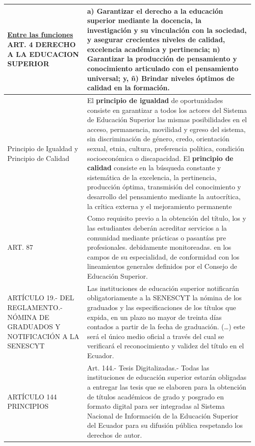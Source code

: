 \documentclass[12pt, a4paper, nofontenc, numbers=endperiod]{apa7}
\begin{document}
{\begin{table}[h]
{{\begin{tabular}{|p{4cm}|p{11.1cm}|}
				\hline
				\vspace*{-0.5mm}\centering\footnotesize \underline{Entre las funciones}\newline
				ART. 4 DERECHO A LA EDUCACION SUPERIOR
				&   \footnotesize a) Garantizar el derecho a la educación superior mediante la docencia, la investigación y su vinculación con la sociedad, y asegurar crecientes niveles de calidad, excelencia académica y pertinencia; n) Garantizar la producción de pensamiento y conocimiento articulado con el pensamiento universal; y, ñ) Brindar niveles óptimos de calidad en la formación.\\
				\hline
				\vspace*{12mm}\centering\footnotesize Principio de Igualdad y Principio de Calidad &  \footnotesize El \textbf{principio de igualdad} de oportunidades consiste en garantizar a todos los actores del Sistema de Educación Superior las mismas posibilidades en el acceso, permanencia, movilidad y egreso del sistema, sin discriminación de género, credo, orientación sexual, etnia, cultura, preferencia política, condición socioeconómica o discapacidad.\newline
				El \textbf{principio de calidad} consiste en la búsqueda constante y sistemática de la excelencia, la pertinencia, producción óptima, transmisión del conocimiento y desarrollo del pensamiento mediante la autocrítica, la crítica externa y el mejoramiento permanente
				\\
				\hline
				\vspace*{4mm}\centering\footnotesize ART. 87 &   \footnotesize Como requisito previo a la obtención del título, los y las estudiantes deberán acreditar servicios a la comunidad mediante prácticas o pasantías pre profesionales. debidamente monitoreadas. en los campos de su especialidad, de conformidad con los lineamientos generales definidos por el Consejo de Educación Superior. \\
				\hline
				\footnotesize ARTÍCULO 19.- DEL REGLAMENTO.- NÓMINA DE GRADUADOS Y NOTIFICACIÓN A LA SENESCYT &   \footnotesize Las instituciones de educación superior notificarán obligatoriamente a la SENESCYT la nómina de los graduados y las especificaciones de los títulos que expida, en un plazo no mayor de treinta días contados a partir de la fecha de graduación. (…) este será el único medio oficial a través del cual se verificará el reconocimiento y validez del título en el Ecuador.  \\
				\hline
				\vspace*{5mm}\centering\footnotesize ARTÍCULO 144 PRINCIPIOS
				&   \footnotesize Art. 144.- Tesis Digitalizadas.- Todas las instituciones de educación superior estarán obligadas a entregar las tesis que se elaboren para la obtención de títulos académicos de grado y posgrado en formato digital para ser integradas al Sistema Nacional de Información de la Educación Superior del Ecuador para su difusión pública respetando los derechos de autor.    \\
				\hline
			\end{tabular}
		}
	}
\end{table}

}
\end{document}

